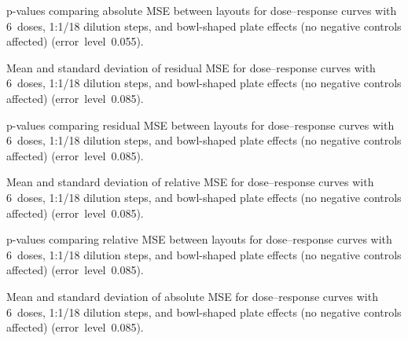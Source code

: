 \begin{table}[p]
    \centering
    \small
    
    \caption{p-values comparing absolute \ECIC{} MSE between layouts for dose--response curves with 6~doses, 1:1/18 dilution steps, and bowl-shaped plate effects (no negative controls affected) (error~level~0.055).}
    \label{tab:dr-absic50-pvalues-6doses-dil18-bowl-0.055}
\end{table}

\begin{table}[p]
    \centering
    \small
    
    \caption{Mean and standard deviation of residual MSE for dose--response curves with 6~doses, 1:1/18 dilution steps, and bowl-shaped plate effects (no negative controls affected) (error~level~0.085).}
    \label{tab:dr-residuals-mean-std-6doses-dil18-bowl-0.085}
\end{table}

\begin{table}[p]
    \centering
    \small
    
    \caption{p-values comparing residual MSE between layouts for dose--response curves with 6~doses, 1:1/18 dilution steps, and bowl-shaped plate effects (no negative controls affected) (error~level~0.085).}
    \label{tab:dr-residuals-pvalues-6doses-dil18-bowl-0.085}
\end{table}

\clearpage
\begin{table}[p]
    \centering
    \small
    
    \caption{Mean and standard deviation of relative \ECIC{} MSE for dose--response curves with 6~doses, 1:1/18 dilution steps, and bowl-shaped plate effects (no negative controls affected) (error~level~0.085).}
    \label{tab:dr-relic50-mean-std-6doses-dil18-bowl-0.085}
\end{table}

\begin{table}[p]
    \centering
    \small
    
    \caption{p-values comparing relative \ECIC{} MSE between layouts for dose--response curves with 6~doses, 1:1/18 dilution steps, and bowl-shaped plate effects (no negative controls affected) (error~level~0.085).}
    \label{tab:dr-relic50-pvalues-6doses-dil18-bowl-0.085}
\end{table}

\begin{table}[p]
    \centering
    \small
    
    \caption{Mean and standard deviation of absolute \ECIC{} MSE for dose--response curves with 6~doses, 1:1/18 dilution steps, and bowl-shaped plate effects (no negative controls affected) (error~level~0.085).}
    \label{tab:dr-absic50-mean-std-6doses-dil18-bowl-0.085}
\end{table}

